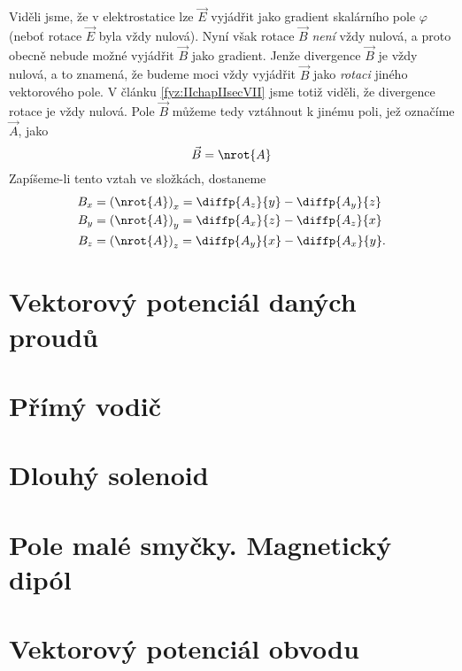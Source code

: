     Viděli jsme, že v elektrostatice lze \(\vec{E}\) vyjádřit jako gradient skalárního pole
    \(\varphi\) (neboť rotace \(\vec{E}\) byla vždy nulová). Nyní však rotace \(\vec{B}\)
    \emph{není} vždy nulová, a proto obecně nebude možné vyjádřit \(\vec{B}\) jako gradient. Jenže
    divergence \(\vec{B}\) je vždy nulová, a to znamená, že budeme moci vždy vyjádřit \(\vec{B}\)
    jako \emph{rotaci} jiného vektorového pole. V článku \ref{fyz:IIchapIIsecVII} jsme totiž viděli,
    že divergence rotace je vždy nulová. Pole \(\vec{B}\) můžeme tedy vztáhnout k jinému poli, jež
    označíme \(\vec{A}\), jako
    \begin{equation}\label{fyz:eq1008}
      \vec{B} = \nrot{A}
    \end{equation}
    Zapíšeme-li tento vztah ve složkách, dostaneme
    \begin{subequations}\label{fyz:eq1009}
      \begin{align}
        B_x &= \left(\nrot{A}\right)_x = \diffp{A_z}{y} - \diffp{A_y}{z} \label{fyz:eq1009a}  \\
        B_y &= \left(\nrot{A}\right)_y = \diffp{A_x}{z} - \diffp{A_z}{x} \label{fyz:eq1009b}  \\
        B_z &= \left(\nrot{A}\right)_z = \diffp{A_y}{x} - \diffp{A_x}{y}.\label{fyz:eq1009c}        
      \end{align}
    \end{subequations}

  \section{Vektorový potenciál daných proudů}\label{fyz:IIchapXIVsecII}
  \section{Přímý vodič}\label{fyz:IIchapXIVsecIII}
  \section{Dlouhý solenoid}\label{fyz:IIchapXIVsecIV}
  \section{Pole malé smyčky. Magnetický dipól}\label{fyz:IIchapXIVsecV}
  \section{Vektorový potenciál obvodu}\label{fyz:IIchapXIVsecVI}
